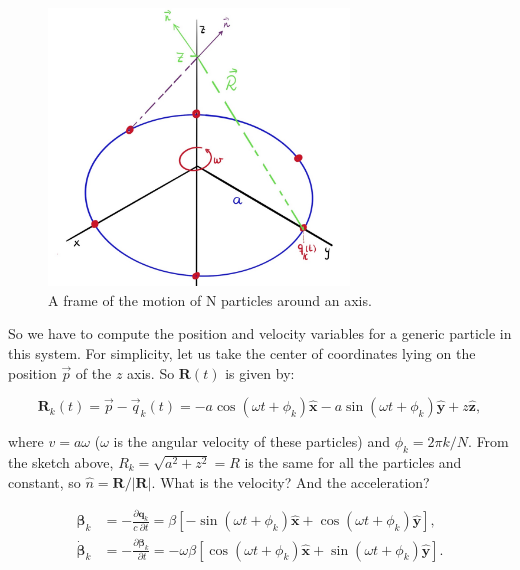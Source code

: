 \begin{figure}[h!]
	\includegraphics[width=8cm]{figures/AMerryGoRound.jpg}
	\centering
	\caption{A frame of the motion of N particles around an axis.}
\end{figure}

So we have to compute the position and velocity variables for a generic particle in this system. For simplicity, let us take the center of coordinates lying on the position $\vec{p}$ of the $z$ axis. So $\mathbf{R} (t)$ is given by:

\begin{equation}
	\mathbf{R}_{k}(t) = \vec{p} - \vec{q}_{k}(t) = -a \cos \left(\omega t+\phi_{k}\right) \hat{\mathbf{x}}-a \sin \left(\omega t+\phi_{k}\right) \hat{\mathbf{y}}+z \hat{\mathbf{z}},
\end{equation}

where $v=a \omega$ ($\omega$ is the angular velocity of these particles) and $\phi_{k}=2 \pi k / N$. From the sketch above, $R_{k}=\sqrt{a^{2}+z^{2}}=R$ is the same for all the particles and constant, so $\hat{n} = \mathbf{R}/ |\mathbf{R}|$. What is the velocity? And the acceleration?

\begin{equation}
	\begin{split}
			\boldsymbol{\beta}_{k}&= -\frac{\partial \mathbf{q}_{k}}{c \: \partial t}=\beta\left[-\sin \left(\omega t+\phi_{k}\right) \hat{\mathbf{x}}+\cos \left(\omega t+\phi_{k}\right) \hat{\mathbf{y}}\right], \\
			\dot{\boldsymbol{\beta}}_{k}&= -\frac{\partial \boldsymbol{\beta}_{k}}{ \: \partial t}= -\omega \beta\left[\cos \left(\omega t+\phi_{k}\right) \hat{\mathbf{x}}+\sin \left(\omega t+\phi_{k}\right) \hat{\mathbf{y}}\right].
	\end{split}
\end{equation}

